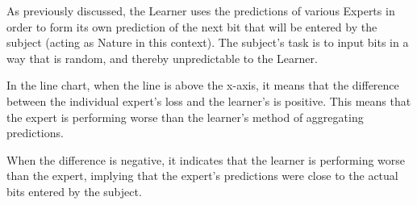

As previously discussed, the Learner uses the predictions of various Experts in order to form its own prediction of the next bit that will be entered by the subject (acting as Nature in this context). The subject's task is to input bits in a way that is random, and thereby unpredictable to the Learner.

In the line chart, when the line is above the x-axis, it means that the difference between the individual expert's loss and the learner's is positive. This means that the expert is performing worse than the learner's method of aggregating predictions.

When the difference is negative, it indicates that the learner is performing worse than the expert, implying that the expert's predictions were close to the actual bits entered by the subject.

